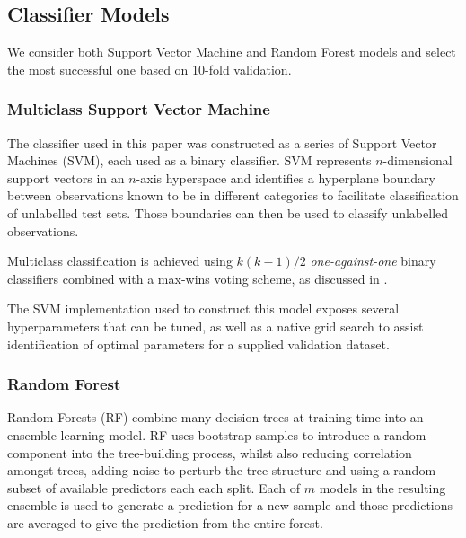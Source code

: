 \documentclass[conference]{IEEEtran}
\let\citep\cite
\begin{document}
\subsection{Classifier Models}\label{sec:classifier-models}

\label{sec:classifiers}

We consider both Support Vector Machine and Random Forest models and
select the most successful one based on 10-fold validation.

\subsubsection{Multiclass Support Vector
Machine}\label{sec:multiclass-support-vector-machine}

\label{sec:svmmethod}

The classifier used in this paper was constructed as a series of Support
Vector Machines (SVM), each used as a binary classifier. SVM represents
\(n\)-dimensional support vectors in an \(n\)-axis hyperspace and
identifies a hyperplane boundary between observations known to be in
different categories to facilitate classification of unlabelled test
sets. Those boundaries can then be used to classify unlabelled
observations.

Multiclass classification is achieved using \(k(k-1)/2\)
\emph{one-against-one} binary classifiers combined with a max-wins
voting scheme, as discussed in \citep{10.1007/11494683_28}.

The SVM implementation used to construct this model exposes several
hyperparameters that can be tuned, as well as a native grid search to
assist identification of optimal parameters for a supplied validation
dataset.

\subsubsection{Random Forest}\label{sec:random-forest}

\label{sec:rfmethod}

Random Forests (RF) \citep{Breiman2001} combine many decision trees at
training time into an ensemble learning model. RF uses bootstrap samples
to introduce a random component into the tree-building process, whilst
also reducing correlation amongst trees, adding noise to perturb the
tree structure and using a random subset of available predictors each
each split. Each of \(m\) models in the resulting ensemble is used to
generate a prediction for a new sample and those predictions are
averaged to give the prediction from the entire forest.
\end{document}
